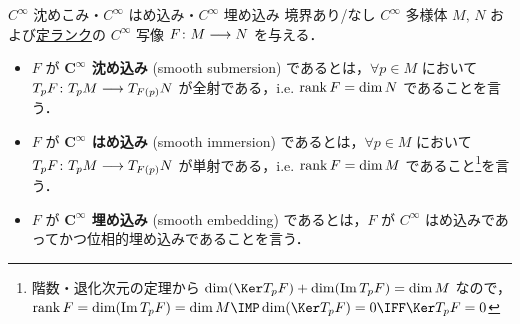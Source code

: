 \documentclass[geometry_main]{subfiles}
\begin{document}
\begin{mydef}[label=def:submersion-smooth]{$C^\infty$ 沈めこみ・$C^\infty$ はめ込み・$C^\infty$ 埋め込み}
    境界あり/なし $C^\infty$ 多様体 $M,\, N$ および\hyperref[def:rank-smooth]{定ランク}の $C^\infty$ 写像 $F \colon M \longrightarrow N$ を与える．
    \begin{itemize}
        \item $F$ が\textbf{ $\bm{C^\infty}$ 沈め込み} (smooth submersion) であるとは，$\forall p \in M$ において $T_p F \colon T_p M \longrightarrow T_{F(p)} N$ が全射である，i.e. $\rank F = \dim N$ であることを言う．
        \item $F$ が\textbf{ $\bm{C^\infty}$ はめ込み} (smooth immersion) であるとは，$\forall p \in M$ において $T_p F \colon T_p M \longrightarrow T_{F(p)} N$ が単射である，i.e. $\rank F = \dim M$ であること\footnote{階数・退化次元の定理から $\dim (\Ker T_p F) + \dim (\Im T_p F) = \dim M$ なので，$\rank F = \dim (\Im T_p F) = \dim M \IMP \dim (\Ker T_p F) = 0 \IFF \Ker T_p F = 0$}を言う．
        \item $F$ が\textbf{ $\bm{C^\infty}$ 埋め込み} (smooth embedding) であるとは，$F$ が $C^\infty$ はめ込みであってかつ位相的埋め込みであることを言う．
    \end{itemize}
\end{mydef}
\end{document}
